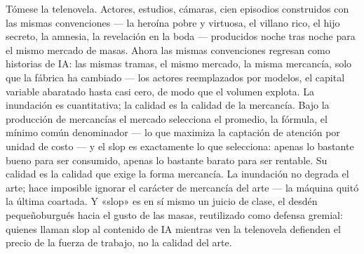 \documentclass[11pt]{article}
\begin{document}
Tómese la telenovela. Actores, estudios, cámaras, cien episodios
construidos con las mismas convenciones --- la heroína pobre y
virtuosa, el villano rico, el hijo secreto, la amnesia, la revelación
en la boda --- producidos noche tras noche para el mismo mercado de
masas. Ahora las mismas convenciones regresan como historias de IA: las
mismas tramas, el mismo mercado, la misma mercancía, solo que la
fábrica ha cambiado --- los actores reemplazados por modelos, el capital
variable abaratado hasta casi cero, de modo que el volumen explota. La
inundación es cuantitativa; la calidad es la calidad de la mercancía.
Bajo la producción de mercancías el mercado selecciona el promedio, la
fórmula, el mínimo común denominador --- lo que maximiza la captación
de atención por unidad de costo --- y el slop es exactamente lo que
selecciona: apenas lo bastante bueno para ser consumido, apenas lo
bastante barato para ser rentable. Su calidad es la calidad que exige
la forma mercancía. La inundación no degrada el arte; hace imposible
ignorar el carácter de mercancía del arte --- la máquina quitó la
última coartada. Y «slop» es en sí mismo un juicio de clase, el desdén
pequeñoburgués hacia el gusto de las masas, reutilizado como defensa
gremial: quienes llaman slop al contenido de IA mientras ven la
telenovela defienden el precio de la fuerza de trabajo, no la calidad
del arte.
\end{document}

